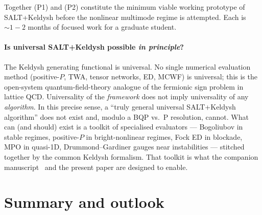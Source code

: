\documentclass[11pt]{article}
\begin{document}
Together (P1) and (P2) constitute the minimum viable working prototype
of SALT+Keldysh before the nonlinear multimode regime is attempted.
Each is $\sim 1{-}2$ months of focused work for a graduate student.

\paragraph{Is universal SALT+Keldysh possible \emph{in principle}?}
The Keldysh generating functional is universal.  No single numerical
evaluation method (positive-$P$, TWA, tensor networks, ED, MCWF) is
universal; this is the open-system quantum-field-theory analogue of
the fermionic sign problem in lattice QCD.  Universality of the
\emph{framework} does not imply universality of any \emph{algorithm}.
In this precise sense, a ``truly general universal SALT+Keldysh
algorithm'' does not exist and, modulo a BQP vs.~P resolution, cannot.
What can (and should) exist is a toolkit of specialised evaluators ---
Bogoliubov in stable regimes, positive-$P$ in bright-nonlinear regimes,
Fock ED in blockade, MPO in quasi-1D, Drummond--Gardiner gauges near
instabilities --- stitched together by the common Keldysh formalism.
That toolkit is what the companion manuscript~\cite{this_companion}
and the present paper are designed to enable.

\section{Summary and outlook}
\label{sec:summary}
\end{document}
